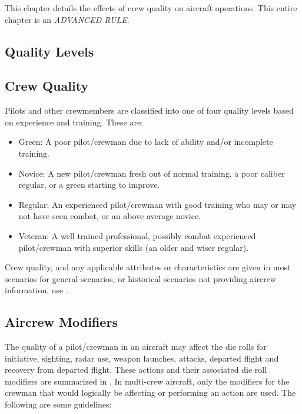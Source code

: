 
\label{rule:crew-ability}

This chapter details the effects of crew quality on aircraft operations. This entire chapter is an \emph{ADVANCED RULE}.

\begin{advancedrules}

    \section{Quality Levels}
    \subsection{Crew Quality} Pilots and other crewmembers are classified into one of four quality levels based on experience and training. These are:

    \begin{itemize}
        \item Green: A poor pilot/crewman due to lack of ability and/or incomplete training.
        \item Novice: A new pilot/crewman fresh out of normal training, a poor caliber regular, or a green starting to improve.
        \item Regular: An experienced pilot/crewman with good training who may or may not have seen combat, or an above average novice.
        \item Veteran: A well trained professional, possibly combat experienced pilot/crewman with superior skills (an older and wiser regular).
    \end{itemize}


    Crew quality, and any applicable attributes or characteristics are given in most scenarios for general scenarios, or historical scenarios not providing aircrew information, use .


    \subsection{Aircrew Modifiers} The quality of a pilot/crewman in an aircraft may affect the die rolls for initiative, sighting, radar use, weapon launches, attacks, departed flight and recovery from departed flight. These actions and their associated die roll modifiers are summarized in . In multi-crew aircraft, only the modifiers for the crewman that would logically be affecting or performing an action are used. The following are some guidelines:


\end{advancedrules}

